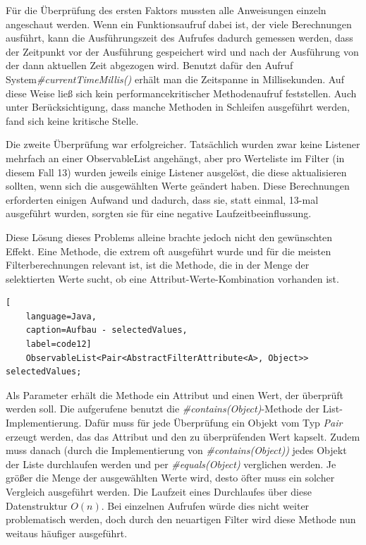 Für die Überprüfung des ersten Faktors mussten alle Anweisungen einzeln angeschaut werden. Wenn ein Funktionsaufruf dabei ist, der viele Berechnungen ausführt, kann die Ausführungszeit des Aufrufes dadurch gemessen werden, dass der Zeitpunkt vor der Ausführung gespeichert wird und nach der Ausführung von der dann aktuellen Zeit abgezogen wird. Benutzt dafür den Aufruf System\textit{\#currentTimeMillis()} erhält man die Zeitspanne in Millisekunden. Auf diese Weise ließ sich kein performancekritischer Methodenaufruf feststellen. Auch unter Berücksichtigung, dass manche Methoden in Schleifen ausgeführt werden, fand sich keine kritische Stelle.

Die zweite Überprüfung war erfolgreicher. Tatsächlich wurden zwar keine Listener mehrfach an einer ObservableList angehängt, aber pro Werteliste im Filter (in diesem Fall 13) wurden jeweils einige Listener ausgelöst, die diese aktualisieren sollten, wenn sich die ausgewählten Werte geändert haben. Diese Berechnungen erforderten einigen Aufwand und dadurch, dass sie, statt einmal, 13-mal ausgeführt wurden, sorgten sie für eine negative Laufzeitbeeinflussung.

Diese Lösung dieses Problems alleine brachte jedoch nicht den gewünschten Effekt. Eine Methode, die extrem oft ausgeführt wurde und für die meisten Filterberechnungen relevant ist, ist die Methode, die in der Menge der selektierten Werte sucht, ob eine Attribut-Werte-Kombination vorhanden ist.

\begin{lstlisting}[
    language=Java,
    caption=Aufbau - selectedValues,
    label=code12]
	ObservableList<Pair<AbstractFilterAttribute<A>, Object>> selectedValues;
\end{lstlisting}

Als Parameter erhält die Methode ein Attribut und einen Wert, der überprüft werden soll. Die aufgerufene benutzt die \textit{\#contains(Object)}-Methode der List-Implementierung. Dafür muss für jede Überprüfung ein Objekt vom Typ \textit{Pair} erzeugt werden, das das Attribut und den zu überprüfenden Wert kapselt. Zudem muss danach (durch die Implementierung von \textit{\#contains(Object))} jedes Objekt der Liste durchlaufen werden und per \textit{\#equals(Object)} verglichen werden. Je größer die Menge der ausgewählten Werte wird, desto öfter muss ein solcher Vergleich ausgeführt werden. Die Laufzeit eines Durchlaufes über diese Datenstruktur $O(n)$. Bei einzelnen Aufrufen würde dies nicht weiter problematisch werden, doch durch den neuartigen Filter wird diese Methode nun weitaus häufiger ausgeführt.

